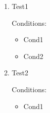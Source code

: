 \label{cases:SampleClass}

\begin{enumerate}

\item Test1

Conditions:
\begin{itemize}
\item Cond1
\item Cond2
\end{itemize}

\item Test2

Conditions:
\begin{itemize}
\item Cond1
\end{itemize}

\end{enumerate}